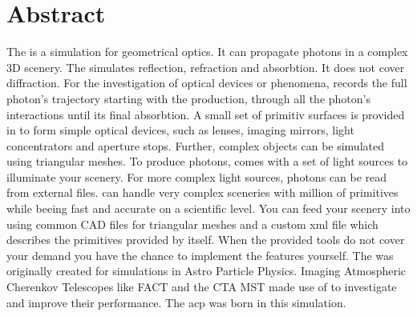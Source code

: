 \documentclass[11pt,a4paper,oneside,titlepage]{book}
\begin{document}
\chapter{Abstract}
%
The \tool{} is a simulation for geometrical optics. 
%
It can propagate photons in a complex 3D scenery.
%
The \tool{} simulates reflection, refraction and absorbtion.
%
It does not cover diffraction.
%
For the investigation of optical devices or phenomena, \tool{} records the full photon's trajectory starting with the production, through all the photon's interactions until its final absorbtion.
%
A small set of primitiv surfaces is provided in \tool{} to form simple optical devices, such as lenses, imaging mirrors, light concentrators and aperture stops.
%
Further, complex objects can be simulated using triangular meshes.
%
To produce photons, \tool{} comes with a set of light sources to illuminate your scenery.
%
For more complex light sources, photons can be read from external files.
%
\tool{} can handle very complex sceneries with million of primitives while beeing fast and accurate on a scientific level.
%
You can feed your scenery into \tool{} using common CAD files for triangular meshes and a custom \tool{} xml file which describes the primitives provided by \tool{} itself.
%
When the provided tools do not cover your demand you have the chance to implement the features yourself.   
%
The \tool{} was originally created for simulations in Astro Particle Physics.
%
Imaging Atmospheric Cherenkov Telescopes like FACT and the CTA MST made use of \tool{} to investigate and improve their performance.
%
The \acf{acp} was born in this simulation.
%


\end{document}
